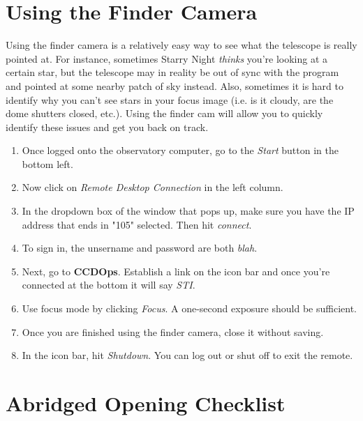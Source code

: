 \documentclass[11pt]{report}
\begin{document}
\chapter{Using the Finder Camera}
Using the finder camera is a relatively easy way to see what the telescope is really pointed at. For instance, sometimes Starry Night \emph{thinks} you're looking at a certain star, but the telescope may in reality be out of sync with the program and pointed at some nearby patch of sky instead. Also, sometimes it is hard to identify why you can't see stars in your focus image (i.e. is it cloudy, are the dome shutters closed, etc.). Using the finder cam will allow you to quickly identify these issues and get you back on track.
\begin{enumerate}
\item Once logged onto the observatory computer, go to the \emph{Start} button in the bottom left.
\item Now click on \emph{Remote Desktop Connection} in the left column.
\item In the dropdown box of the window that pops up, make sure you have the IP address that ends in "105" selected. Then hit \emph{connect}.
\item To sign in, the unsername and password are both \emph{blah}.
\item Next, go to {\bf CCDOps}.  Establish a link on the icon bar and once you're connected at the bottom it will say \emph{STI}.
\item Use focus mode by clicking \emph{Focus}. A one-second exposure should be sufficient.
\item Once you are finished using the finder camera, close it without saving.
\item In the icon bar, hit \emph{Shutdown}. You can log out or shut off to exit the remote.
\end{enumerate}

\chapter{Abridged Opening Checklist}
\end{document}
